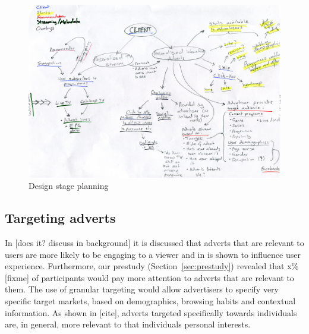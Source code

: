 	\begin{landscape}
	\begin{figure}[th]
		\centering
		\includegraphics[height=\textwidth]{images/design.jpg}
		\caption{Design stage planning}
		\label{fig:designing}
	\end{figure}
	\end{landscape}
	\newpage

\subsection{Targeting adverts}
	\label{sec:design_adverts}

	In \citet{nettelhorst2012effects}[does it? discuss in background] it is discussed that adverts that are relevant to users are more likely to be engaging to a viewer and in \citet{yahoo-intrusive-advertising} is shown to influence user experience. Furthermore, our prestudy (Section~\ref{sec:prestudy}) revealed that x\% [fixme] of participants would pay more attention to adverts that are relevant to them. The use of granular targeting would allow advertisers to specify very specific target markets, based on demographics, browsing habits and contextual information. As shown in [cite], adverts targeted specifically towards individuals are, in general, more relevant to that individuals personal interests.

